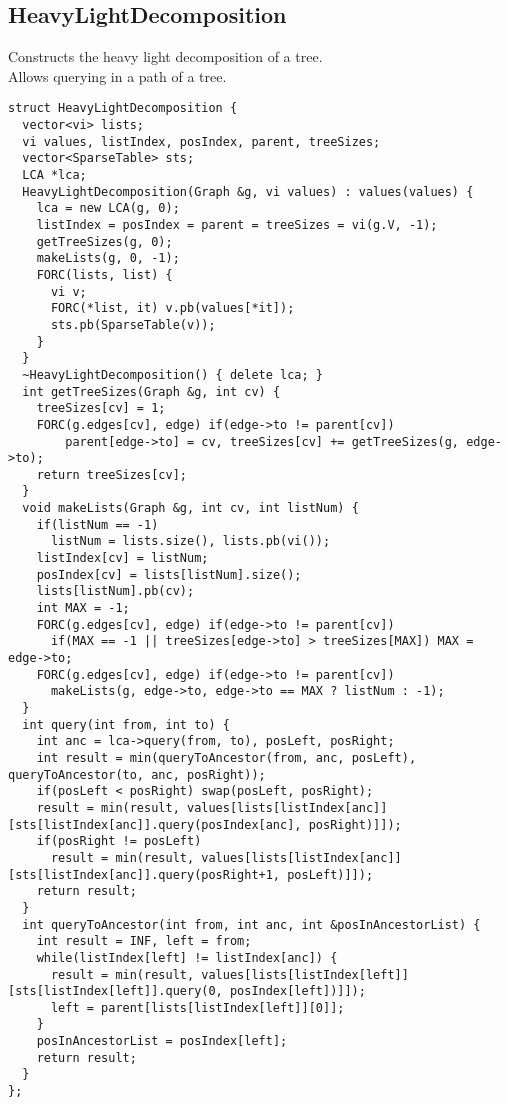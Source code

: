 \documentclass[11pt, oneside]{article}
\begin{document}
\subsection{HeavyLightDecomposition}
Constructs the heavy light decomposition of a tree.\\
Allows querying in a path of a tree.
\begin{lstlisting}
struct HeavyLightDecomposition {
  vector<vi> lists;
  vi values, listIndex, posIndex, parent, treeSizes;
  vector<SparseTable> sts;
  LCA *lca;
  HeavyLightDecomposition(Graph &g, vi values) : values(values) {
    lca = new LCA(g, 0);
    listIndex = posIndex = parent = treeSizes = vi(g.V, -1);
    getTreeSizes(g, 0);
    makeLists(g, 0, -1);
    FORC(lists, list) {
      vi v;
      FORC(*list, it) v.pb(values[*it]);
      sts.pb(SparseTable(v));
    }
  }
  ~HeavyLightDecomposition() { delete lca; }
  int getTreeSizes(Graph &g, int cv) {
    treeSizes[cv] = 1;
    FORC(g.edges[cv], edge) if(edge->to != parent[cv])
        parent[edge->to] = cv, treeSizes[cv] += getTreeSizes(g, edge->to);  
    return treeSizes[cv];
  }
  void makeLists(Graph &g, int cv, int listNum) {
    if(listNum == -1)
      listNum = lists.size(), lists.pb(vi());
    listIndex[cv] = listNum;
    posIndex[cv] = lists[listNum].size();
    lists[listNum].pb(cv);
    int MAX = -1;
    FORC(g.edges[cv], edge) if(edge->to != parent[cv])
      if(MAX == -1 || treeSizes[edge->to] > treeSizes[MAX]) MAX = edge->to;
    FORC(g.edges[cv], edge) if(edge->to != parent[cv])
      makeLists(g, edge->to, edge->to == MAX ? listNum : -1); 
  }
  int query(int from, int to) {
    int anc = lca->query(from, to), posLeft, posRight;
    int result = min(queryToAncestor(from, anc, posLeft), queryToAncestor(to, anc, posRight));
    if(posLeft < posRight) swap(posLeft, posRight);
    result = min(result, values[lists[listIndex[anc]][sts[listIndex[anc]].query(posIndex[anc], posRight)]]);
    if(posRight != posLeft)
      result = min(result, values[lists[listIndex[anc]][sts[listIndex[anc]].query(posRight+1, posLeft)]]);
    return result;
  }
  int queryToAncestor(int from, int anc, int &posInAncestorList) {
    int result = INF, left = from;
    while(listIndex[left] != listIndex[anc]) {
      result = min(result, values[lists[listIndex[left]][sts[listIndex[left]].query(0, posIndex[left])]]);
      left = parent[lists[listIndex[left]][0]];
    }
    posInAncestorList = posIndex[left];
    return result;
  }
};
\end{lstlisting}
\end{document}
